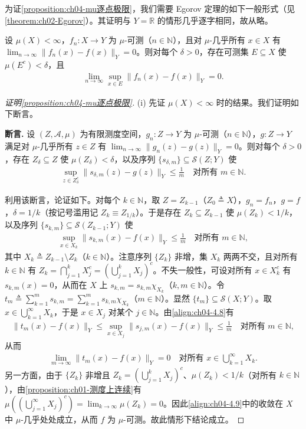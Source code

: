 \documentclass[../../main.tex]{subfiles}%
\begin{document}
为证\cref{proposition:ch04-mu逐点极限}，我们需要 Egorov 定理的如下一般形式（见\cref{theorem:ch02-Egorov}）。其证明与 $Y=\mathbb{R}$ 的情形几乎逐字相同，故从略。

\begin{theorem}[Egorov]\label{theorem:ch04-Egorov}
设 $\mu(X)<\infty$，$f_n:X\to Y$ 为 $\mu$-可测（$n\in\mathbb{N}$），且对 $\mu$-几乎所有 $x\in X$ 有 $\lim_{n\to\infty}\|f_n(x)-f(x)\|_Y=0$。则对每个 $\delta>0$，存在可测集 $E\subseteq X$ 使 $\mu(E^c)<\delta$，且
\begin{align*}
\lim_{n\to\infty}\sup_{x\in E}\|f_n(x)-f(x)\|_Y=0.
\end{align*}
\end{theorem}

\begin{proof}[证明\cref{proposition:ch04-mu逐点极限}]
(i) 先证 $\mu(X)<\infty$ 时的结果。我们证明如下断言。

\noindent\textbf{断言.} 设 $(Z,\mathcal{A},\mu)$ 为有限测度空间，$g_n:Z\to Y$ 为 $\mu$-可测（$n\in\mathbb{N}$），$g:Z\to Y$ 满足对 $\mu$-几乎所有 $z\in Z$ 有 $\lim_{n\to\infty}\|g_n(z)-g(z)\|_Y=0$。则对每个 $\delta>0$，存在 $Z_\delta\subseteq Z$ 使 $\mu(Z_\delta)<\delta$，以及序列 $\{s_{\delta,m}\}\subseteq\mathcal{S}(Z;Y)$ 使
\begin{align}
\sup_{z\in Z_\delta^c}\|s_{\delta,m}(z)-g(z)\|_Y\leqslant\frac1m\quad\text{对所有 }m\in\mathbb{N}. \label{align:ch04-4.7}
\end{align}

利用该断言，论证如下。对每个 $k\in\mathbb{N}$，取 $Z=Z_{k-1}$（$Z_0\triangleq X$），$g_n=f_n$，$g=f$，$\delta=1/k$（按记号滥用记 $Z_k\equiv Z_{1/k}$）。于是存在 $Z_k\subseteq Z_{k-1}$ 使 $\mu(Z_k)<1/k$，以及序列 $\{s_{k,m}\}\subseteq\mathcal{S}(Z_{k-1};Y)$ 使
\begin{align}
\sup_{x\in X_k}\|s_{k,m}(x)-f(x)\|_Y\leqslant\frac1m\quad\text{对所有 }m\in\mathbb{N}, \label{align:ch04-4.8}
\end{align}
其中 $X_k\triangleq Z_{k-1}\setminus Z_k$（$k\in\mathbb{N}$）。注意序列 $\{Z_k\}$ 非增，集 $X_k$ 两两不交，且对所有 $k\in\mathbb{N}$ 有 $Z_k=\bigcap_{j=1}^k X_j^c=(\bigcup_{j=1}^k X_j)^c$。不失一般性，可设对所有 $x\in X_k^c$ 有 $s_{k,m}(x)=0$，从而在 $X$ 上 $s_{k,m}=s_{k,m}\chi_{X_k}$（$k,m\in\mathbb{N}$）。令 $t_m\triangleq \sum_{k=1}^m s_{k,m}=\sum_{k=1}^m s_{k,m}\chi_{X_k}$（$m\in\mathbb{N}$）。显然 $\{t_m\}\subseteq\mathcal{S}(X;Y)$。取 $x\in\bigcup_{k=1}^\infty X_k$，于是 $x\in X_j$ 对某个 $j\in\mathbb{N}$。由\eqref{align:ch04-4.8}有
\begin{align*}
\|t_m(x)-f(x)\|_Y\leqslant\sup_{x\in X_j}\|s_{j,m}(x)-f(x)\|_Y\leqslant\frac1m\quad\text{对所有 }m\in\mathbb{N},
\end{align*}
从而
\begin{align}
\lim_{m\to\infty}\|t_m(x)-f(x)\|_Y=0\quad\text{对所有 }x\in\bigcup_{k=1}^\infty X_k. \label{align:ch04-4.9}
\end{align}
另一方面，由于 $\{Z_k\}$ 非增且 $Z_k=(\bigcup_{j=1}^k X_j)^c$、$\mu(Z_k)<1/k$（对所有 $k\in\mathbb{N}$），由\cref{proposition:ch01-测度上连续}有 $\mu((\bigcup_{j=1}^\infty X_j)^c)=\lim_{k\to\infty}\mu(Z_k)=0$。因此\eqref{align:ch04-4.9}中的收敛在 $X$ 中 $\mu$-几乎处处成立，从而 $f$ 为 $\mu$-可测。故此情形下结论成立。


\end{proof}
\end{document}
